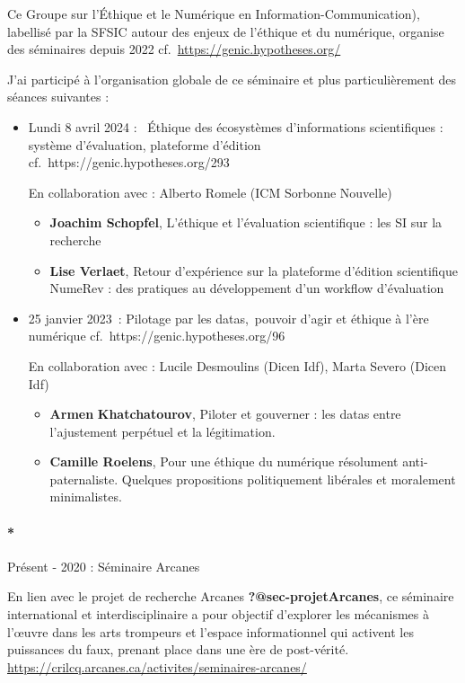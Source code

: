 \documentclass[
  a4paper,
  DIV=11,
  numbers=noendperiod]{scrreprt}
\let\oldparagraph\paragraph
\renewcommand{\paragraph}[1]{\oldparagraph{#1}\mbox{}}
\begin{document}
Ce Groupe sur l'Éthique et le Numérique en Information-Communication),
labellisé par la SFSIC autour des enjeux de l'éthique et du numérique,
organise des séminaires depuis 2022
cf.~\url{https://genic.hypotheses.org/}

J'ai participé à l'organisation globale de ce séminaire et plus
particulièrement des séances suivantes :

\begin{itemize}
\item
  Lundi 8 avril 2024 :~ Éthique des écosystèmes d'informations
  scientifiques : système d'évaluation, plateforme d'édition
  cf.~https://genic.hypotheses.org/293

  En collaboration avec : Alberto Romele (ICM Sorbonne Nouvelle)

  \begin{itemize}
  \item
    \textbf{Joachim Schopfel}, L'éthique et l'évaluation scientifique :
    les SI sur la recherche
  \item
    \textbf{Lise Verlaet}, Retour d'expérience sur la plateforme
    d'édition scientifique NumeRev : des pratiques au développement d'un
    workflow d'évaluation
  \end{itemize}
\item
  25 janvier 2023~: Pilotage par les datas,~pouvoir d'agir et éthique à
  l'ère numérique cf.~https://genic.hypotheses.org/96

  En collaboration avec : Lucile Desmoulins (Dicen Idf), Marta Severo
  (Dicen Idf)

  \begin{itemize}
  \item
    \textbf{Armen} \textbf{Khatchatourov}, Piloter et gouverner : les
    datas entre l'ajustement perpétuel et la légitimation.
  \item
    \textbf{Camille Roelens}, Pour une éthique du numérique résolument
    anti-paternaliste. Quelques propositions politiquement libérales et
    moralement minimalistes.
  \end{itemize}
\end{itemize}

\paragraph*{Présent - 2020 : Séminaire
Arcanes}\label{pruxe9sent---2020-suxe9minaire-arcanes}

En lien avec le projet de recherche Arcanes
\textbf{?@sec-projetArcanes}, ce séminaire international et
interdisciplinaire a pour objectif d'explorer les mécanismes à l'œuvre
dans les arts trompeurs et l'espace informationnel qui activent les
puissances du faux, prenant place dans une ère de post-vérité.
\url{https://crilcq.arcanes.ca/activites/seminaires-arcanes/}
\end{document}
